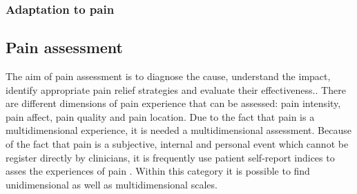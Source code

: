  \subsubsection{Adaptation to pain}
 \subsection{Pain assessment}
The aim of pain assessment is to diagnose the cause, understand the impact, identify appropriate pain relief strategies and evaluate their effectiveness.\cite{art and science}. There are different dimensions of pain experience that can be assessed: pain intensity, pain affect, pain quality and pain location. Due to the fact that pain is a multidimensional experience, it is needed a multidimensional assessment. %
Because of the fact that pain is a subjective, internal and personal event which cannot be register directly by clinicians, it is frequently use patient self-report indices to asses the experiences of pain \cite{libro pain}. Within this category it is possible to find unidimensional as well as multidimensional scales.
